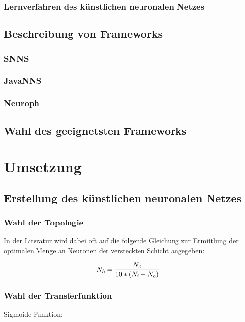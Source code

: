 \documentclass[a4paper,DIV11,bibliography=totoc,headings=normal,ngerman,headsepline,listof=totoc]{scrreprt}
\newcommand*{\formelentry}[1]{\addcontentsline{for}{formel}{\protect\numberline{Formel~\theequation} #1}}
\begin{document}
\subsection{Lernverfahren des künstlichen neuronalen Netzes} %
\section{Beschreibung von Frameworks} %
\subsection{SNNS} %
\subsection{JavaNNS}  %
\subsection{Neuroph} %
\section{Wahl des geeignetsten Frameworks} %
\chapter{Umsetzung} %
\section{Erstellung des künstlichen neuronalen Netzes} %

\subsection{Wahl der Topologie} %
In der Literatur wird dabei oft auf die folgende Gleichung zur Ermittlung der optimalen  Menge an Neuronen der versteckten Schicht angegeben:

\begin{equation}\formelentry{Optimale Anzahl Neuronen in der versteckten Schicht}
  N_h = \frac{N_d}{10*(N_i+N_o)}
\end{equation}

\subsection{Wahl der Transferfunktion} %

Sigmoide Funktion:
\end{document}
